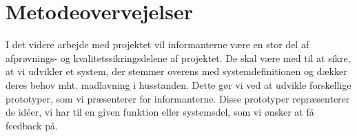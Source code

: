\section{Metodeovervejelser}
\label{sec:metodeovervejelser}

I det videre arbejde med projektet vil informanterne være en stor del af afprøvnings- og kvalitetssikringsdelene af projektet. De skal være med til at sikre, at vi udvikler et system, der stemmer overens med systemdefinitionen og dækker deres behov mht. madlavning i husstanden. Dette gør vi ved at udvikle forskellige prototyper, som vi præsenterer for informanterne. Disse prototyper repræsenterer de idéer, vi har til en given funktion eller systemsdel, som vi ønsker at få feedback på.


